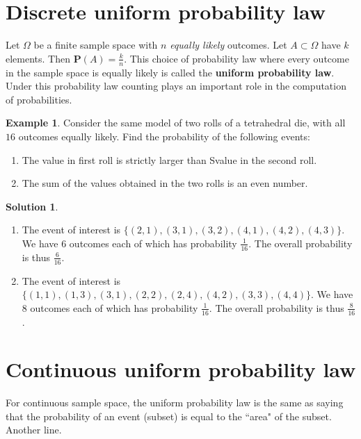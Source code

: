 \documentclass[11pt]{amsart}
\theoremstyle{definition} \newtheorem{thm}{Theorem} \theoremstyle{plain}
\theoremstyle{definition} \newtheorem*{nnthm}{Theorem} \theoremstyle{plain}
\theoremstyle{definition} \newtheorem{lem}{Lemma} \theoremstyle{plain}
\theoremstyle{definition} \newtheorem*{nnlem}{Lemma} \theoremstyle{plain}
\theoremstyle{definition} \newtheorem{prf}{Proof} \theoremstyle{plain}
\theoremstyle{definition} \newtheorem*{nnprf}{Proof} \theoremstyle{plain}
\theoremstyle{definition} \newtheorem{eg}{Example} \theoremstyle{plain}
\theoremstyle{definition} \newtheorem*{sol}{Solution} \theoremstyle{plain}
\newcommand{\prob}[1]{\mathbf{P}(#1)}
\begin{document}
\section{Discrete uniform probability law}
Let $\Omega$ be a finite sample space with $n$ \emph{equally likely} outcomes. 
Let $A \subset \Omega$ have $k$ elements. Then $\prob{A} = \frac{k}{n}$. This 
choice of probability law where every outcome in the sample space is equally 
likely is called the \textbf{uniform probability law}. Under this probability 
law counting plays an important role in the computation of probabilities.
 
\begin{eg}
Consider the same model of two rolls of a tetrahedral die, with all $16$ 
outcomes equally likely. Find the probability of the following events:
\begin{enumerate}
\item
The value in first roll is strictly larger than Svalue in the second roll.
\item
The sum of the values obtained in the two rolls is an even number.
\end{enumerate}
\end{eg}
\begin{sol}
\hfill
\begin{enumerate}
\item
The event of interest is $\{ (2, 1), (3, 1), (3, 2), (4, 1), (4, 2), (4, 3) \}$. 
We have $6$ outcomes each of which has probability $\frac{1}{16}$. The overall probability is thus $\frac{6}{16}$.
\item
The event of interest is $\{ (1, 1), (1, 3), (3, 1), (2, 2), (2, 4), (4, 2), 
(3, 3), (4, 4) \}$. We have $8$ outcomes each of which has probability 
$\frac{1}{16}$. The overall probability is thus $\frac{8}{16}$.
\end{enumerate}
\end{sol}


\section{Continuous uniform probability law}
For continuous sample space, the uniform probability law is the same as saying 
that the probability of an event (subset) is equal to the ``area" of the subset.
Another line.
\end{document}
